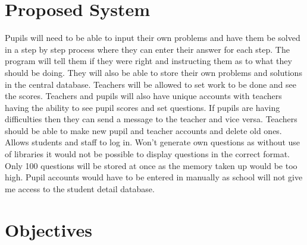 \documentclass[a4paper,12pt]{book}
\begin{document}
\clearpage
\section{Proposed System}        

Pupils will need to be able to input their own problems and have them be solved in a step by step process where they can enter their answer for each step. The program will tell them if they were right and instructing them as to what they should be doing. They will also be able to store their own problems and solutions in the central database.  Teachers will be allowed to set work to be done and see the scores. Teachers and pupils will also have unique accounts with teachers having the ability to see pupil scores and set questions. If pupils are having difficulties then they can send a message to the teacher and vice versa. Teachers should be able to make new pupil and teacher accounts and delete old ones.  Allows students and staff to log in. Won’t generate own questions as without use of libraries it would not be possible to display questions in the correct format. Only 100 questions will be stored at once as the memory taken up would be too high. Pupil accounts would have to be entered in manually as school will not give me access to the student detail database.\\

\section{Objectives}
\end{document}
